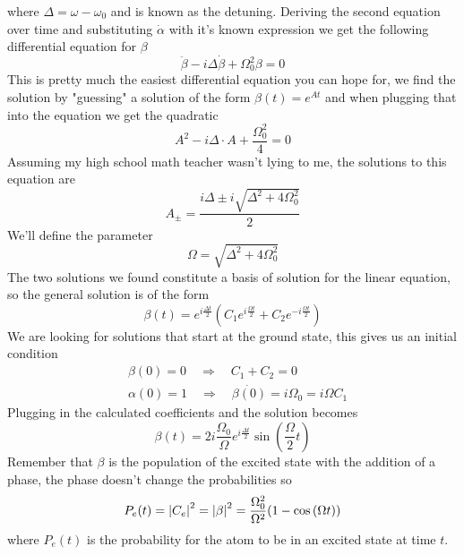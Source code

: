 \documentclass[english, a4paper, 12pt, twoside]{article}
\numberwithin{equation}{section} %
\begin{document}
where $\Delta = \omega - \omega_0$ and is known as the detuning. Deriving the second equation over time and substituting $\dot{\alpha}$ with it's known expression we get the following differential equation for $\beta$
\[
    \ddot{\beta} - i \Delta \dot{\beta} + \Omega_0^2\beta = 0
\]
This is pretty much the easiest differential equation you can hope for, we find the solution by "guessing" a solution of the form $\beta(t) = e^{A t}$ and when plugging that into the equation we get the quadratic
\[
    A^2 - i \Delta \cdot A + \frac{\Omega_0^2}{4} = 0
\]
Assuming my high school math teacher wasn't lying to me, the solutions to this equation are
\[
    A_{\pm} = \frac{i \Delta \pm i\sqrt{\Delta^2 + 4\Omega_0^2}}{2}
\]
We'll define the parameter
\[
    \Omega = \sqrt{\Delta^2 + 4\Omega_0^2}
\]
The two solutions we found constitute a basis of solution for the linear equation, so the general solution is of the form
\[
    \beta(t) = e^{i\frac{\Delta t}{2}}(C_1 e^{i \frac{\Omega t}{2}} + C_2 e^{-i \frac{\Omega t}{2}})
\]
We are looking for solutions that start at the ground state, this gives us an initial condition
\begin{align*}
    &\beta(0) = 0 \quad \Rightarrow \quad C_1 + C_2 = 0 \\
    &\alpha(0) = 1 \quad \Rightarrow \quad \dot{\beta(0)} = i \Omega_0 = i \Omega C_1
\end{align*}
Plugging in the calculated coefficients and the solution becomes
\[
    \beta(t) = 2 i \frac{\Omega_0}{\Omega}e^{i \frac{\Delta t}{2}} \sin{(\frac{\Omega}{2}t)}
\]
Remember that $\beta$ is the population of the excited state with the addition of a phase, the phase doesn't change the probabilities so
\[
    P_e(t) = \abs{C_e}^2 = \abs{\beta}^2 = \frac{\Omega_0^2}{\Omega^2}(1 - \cos{(\Omega t)})
\]
where $P_e(t)$ is the probability for the atom to be in an excited state at time $t$.
\end{document}
